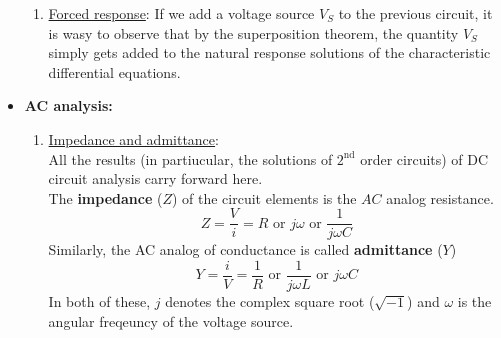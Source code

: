 \documentclass[a4paper]{article}
\begin{document}
\begin{itemize}
\begin{enumerate}
    \item \underline{Forced response}: If we add a voltage source $V_S$ to the previous circuit, it is wasy to observe that by the superposition theorem, the quantity $V_S$ simply gets added to the natural response solutions of the characteristic differential equations.
    \end{enumerate}
    
  \item \textbf{AC analysis:}\\
    \begin{enumerate}
    \item \underline{Impedance and admittance}:\\
      All the results (in partiucular, the solutions of $2^{\text{nd}}$ order circuits) of DC circuit analysis carry forward here.\\
      The \textbf{impedance} ($Z$) of the circuit elements is the $AC$ analog resistance.
      \begin{equation*}
        Z = \frac{V}{i} = R \text{ or } j\omega  \text{ or } \frac{1}{j\omega C}
      \end{equation*}
      Similarly, the AC analog of conductance is called \textbf{admittance} ($Y$)
      \begin{equation*}
        Y = \frac{i}{V} = \frac{1}{R} \text{ or } \frac{1}{j\omega L} \text{ or }j\omega C
      \end{equation*}
      In both of these, $j$ denotes the complex square root ($\sqrt{-1}$) and $\omega$ is the angular freqeuncy of the voltage source.


\end{enumerate}
\end{itemize}
\end{document}
